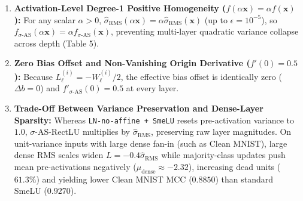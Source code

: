 \documentclass[11pt, a4paper]{article}
\begin{document}
\begin{enumerate}
    \item \textbf{Activation-Level Degree-1 Positive Homogeneity ($f(\alpha\mathbf{x}) = \alpha f(\mathbf{x})$):} For any scalar $\alpha > 0$, $\hat{\sigma}_{\text{RMS}}(\alpha\mathbf{x}) = \alpha\hat{\sigma}_{\text{RMS}}(\mathbf{x})$ (up to $\epsilon = 10^{-5}$), so $f_{\sigma\text{-AS}}(\alpha\mathbf{x}) = \alpha f_{\sigma\text{-AS}}(\mathbf{x})$, preventing multi-layer quadratic variance collapse across depth (Table 5).
    \item \textbf{Zero Bias Offset and Non-Vanishing Origin Derivative ($f'(0) = 0.5$):} Because $L_{\ell}^{(i)} = -W_{\ell}^{(i)}/2$, the effective bias offset is identically zero ($\Delta b = 0$) and $f'_{\sigma\text{-AS}}(0) = 0.5$ at every layer.
    \item \textbf{Trade-Off Between Variance Preservation and Dense-Layer Sparsity:} Whereas \texttt{LN-no-affine + SmeLU} resets pre-activation variance to $1.0$, $\sigma$-AS-RectLU multiplies by $\hat{\sigma}_{\text{RMS}}$, preserving raw layer magnitudes. On unit-variance inputs with large dense fan-in (such as Clean MNIST), large dense RMS scales widen $L = -0.4\hat{\sigma}_{\text{RMS}}$ while majority-class updates push mean pre-activations negatively ($\mu_{\text{dense}} \approx -2.32$), increasing dead units ($61.3\%$) and yielding lower Clean MNIST MCC ($0.8850$) than standard SmeLU ($0.9270$).
\end{enumerate}
\end{document}
